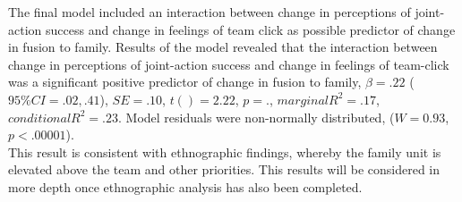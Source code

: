
 The final model included an interaction between change in perceptions of joint-action success and change in feelings of team click as possible predictor of change in fusion to family.  Results of the model revealed that the interaction between change in perceptions of joint-action success and change in feelings of team-click was a significant positive predictor of change in fusion to family, $\beta = .22$ ($95\% CI =  .02, .41$), $SE = .10$, $t() = 2.22$, $p = .$, $marginal R^2 = .17$, $conditional R^2 = .23$. Model residuals were non-normally distributed, ($W = 0.93$, $p < .00001$).\\

 This result is consistent with ethnographic findings, whereby the family unit is elevated above the team and other priorities.  This results will be considered in more depth once ethnographic analysis has also been completed.
